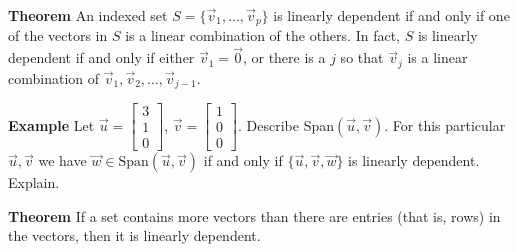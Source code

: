   \begin{frame}[fragile]
\textbf{Theorem} 
 An indexed set $S = \{ \vec{v}_1, \dots , \vec{v}_p \}$ is linearly dependent
 if and only if one of the vectors in $S$ is a linear combination of the others.
 In fact, $S$ is linearly dependent if and only if either 
 $\vec{v}_1 = \vec{0}$, or there is a $j$ so that 
 $\vec{v}_j$ is a linear combination of 
 $\vec{v}_1, \vec{v}_2, \dots, \vec{v}_{j-1}$.

%
%
%
%
\end{frame}

  \begin{frame}[fragile]
\textbf{Example}
Let $\vec{u} = \left[\begin{array}{r} 3 \\ 1 \\ 0 \end{array}\right]$, 
$\vec{v} = \left[\begin{array}{r} 1 \\ 0 \\ 0 \end{array}\right]$.  Describe 
Span$(\vec{u}, \vec{v})$.
For this particular $\vec{u}, \vec{v}$ we have 
$\vec{w} \in \mbox{Span}(\vec{u}, \vec{v})$ if and only if 
$\{ \vec{u}, \vec{v}, \vec{w} \}$ is linearly dependent.  Explain.

\end{frame}

  \begin{frame}[fragile]
\textbf{Theorem}
 If a set contains more vectors than there are entries (that is, rows) 
 in the vectors, then it is linearly dependent.

%
%
\end{frame}

